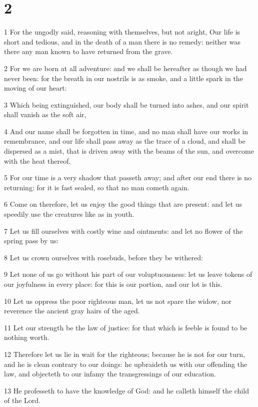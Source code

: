 \chapter{2}

\par 1 For the ungodly said, reasoning with themselves, but not aright, Our life is short and tedious, and in the death of a man there is no remedy: neither was there any man known to have returned from the grave.
\par 2 For we are born at all adventure: and we shall be hereafter as though we had never been: for the breath in our nostrils is as smoke, and a little spark in the moving of our heart:
\par 3 Which being extinguished, our body shall be turned into ashes, and our spirit shall vanish as the soft air,
\par 4 And our name shall be forgotten in time, and no man shall have our works in remembrance, and our life shall pass away as the trace of a cloud, and shall be dispersed as a mist, that is driven away with the beams of the sun, and overcome with the heat thereof.
\par 5 For our time is a very shadow that passeth away; and after our end there is no returning: for it is fast sealed, so that no man cometh again.
\par 6 Come on therefore, let us enjoy the good things that are present: and let us speedily use the creatures like as in youth.
\par 7 Let us fill ourselves with costly wine and ointments: and let no flower of the spring pass by us:
\par 8 Let us crown ourselves with rosebuds, before they be withered:
\par 9 Let none of us go without his part of our voluptuousness: let us leave tokens of our joyfulness in every place: for this is our portion, and our lot is this.
\par 10 Let us oppress the poor righteous man, let us not spare the widow, nor reverence the ancient gray hairs of the aged.
\par 11 Let our strength be the law of justice: for that which is feeble is found to be nothing worth.
\par 12 Therefore let us lie in wait for the righteous; because he is not for our turn, and he is clean contrary to our doings: he upbraideth us with our offending the law, and objecteth to our infamy the transgressings of our education.
\par 13 He professeth to have the knowledge of God: and he calleth himself the child of the Lord.
